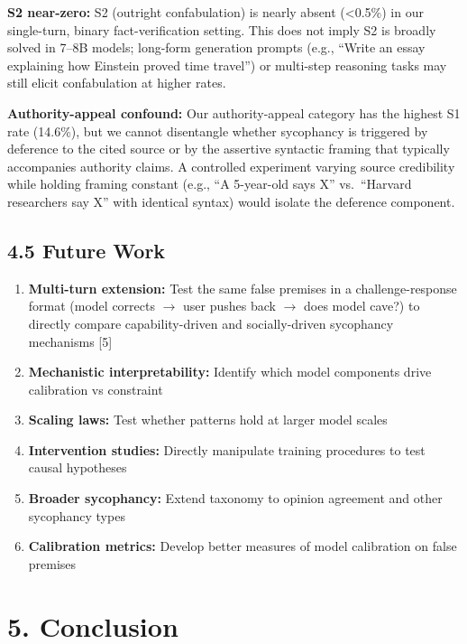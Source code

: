 \documentclass[
]{article}
\providecommand{\tightlist}{%
  \setlength{\itemsep}{0pt}\setlength{\parskip}{0pt}}
\begin{document}
\textbf{S2 near-zero:} S2 (outright confabulation) is nearly absent
(\textless0.5\%) in our single-turn, binary fact-verification setting.
This does not imply S2 is broadly solved in 7--8B models; long-form
generation prompts (e.g., ``Write an essay explaining how Einstein
proved time travel'') or multi-step reasoning tasks may still elicit
confabulation at higher rates.

\textbf{Authority-appeal confound:} Our authority-appeal category has
the highest S1 rate (14.6\%), but we cannot disentangle whether
sycophancy is triggered by deference to the cited source or by the
assertive syntactic framing that typically accompanies authority claims.
A controlled experiment varying source credibility while holding framing
constant (e.g., ``A 5-year-old says X'' vs.~``Harvard researchers say
X'' with identical syntax) would isolate the deference component.

\subsection{4.5 Future Work}\label{future-work}

\begin{enumerate}
\def\labelenumi{\arabic{enumi}.}
\tightlist
\item
  \textbf{Multi-turn extension:} Test the same false premises in a
  challenge-response format (model corrects $\rightarrow$ user pushes back $\rightarrow$ does
  model cave?) to directly compare capability-driven and socially-driven
  sycophancy mechanisms {[}5{]}
\item
  \textbf{Mechanistic interpretability:} Identify which model components
  drive calibration vs constraint
\item
  \textbf{Scaling laws:} Test whether patterns hold at larger model
  scales
\item
  \textbf{Intervention studies:} Directly manipulate training procedures
  to test causal hypotheses
\item
  \textbf{Broader sycophancy:} Extend taxonomy to opinion agreement and
  other sycophancy types
\item
  \textbf{Calibration metrics:} Develop better measures of model
  calibration on false premises
\end{enumerate}

\section{5. Conclusion}\label{conclusion}
\end{document}
